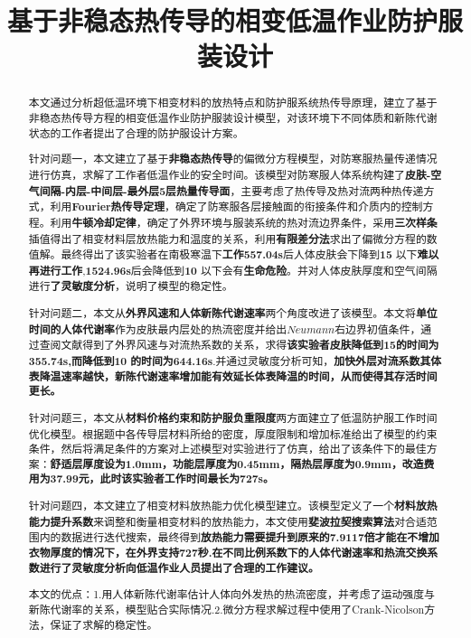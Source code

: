 \documentclass[withoutpreface,bwprint]{cumcmthesis} %
\title{基于非稳态热传导的相变低温作业防护服装设计}
\begin{document}
\maketitle
\begin{abstract}
	本文通过分析超低温环境下相变材料的放热特点和防护服系统热传导原理，建立了基于非稳态热传导方程的相变低温作业防护服装设计模型，对该环境下不同体质和新陈代谢状态的工作者提出了合理的防护服设计方案。
		
	针对问题一，本文建立了基于\textbf{非稳态热传导}的偏微分方程模型，对防寒服热量传递情况进行仿真，求解了工作者低温作业的安全时间。该模型对防寒服人体系统构建了\textbf{皮肤-空气间隔-内层-中间层-最外层5层热量传导面}，主要考虑了热传导及热对流两种热传递方式，利用\textbf{Fourier热传导定理}，确定了防寒服各层接触面的衔接条件和介质内的控制方程。利用\textbf{牛顿冷却定律}，确定了外界环境与服装系统的热对流边界条件，采用\textbf{三次样条}插值得出了相变材料层放热能力和温度的关系，利用\textbf{有限差分法}求出了偏微分方程的数值解。最终得出了该实验者在南极寒温下\textbf{工作557.04s}后人体皮肤会下降到\textbf{15} \textcelsius 以下\textbf{难以再进行工作},\textbf{1524.96s}后会降低到\textbf{10} \textcelsius 以下会有\textbf{生命危险}。并对人体皮肤厚度和空气间隔进行\textbf{了灵敏度分析}，说明了模型的稳定性。
	
	针对问题二，本文从\textbf{外界风速和人体新陈代谢速率}两个角度改进了该模型。本文将\textbf{单位时间的人体代谢率}作为皮肤最内层处的热流密度并给出$Neumann$右边界初值条件，通过查阅文献得到了外界风速与对流热系数的关系，求得\textbf{该实验者皮肤降低到15}\textcelsius \textbf{的时间为355.74s,而降低到10} \textcelsius \textbf{的时间为644.16s}.并通过灵敏度分析可知，\textbf{加快外层对流系数其体表降温速率越快，新陈代谢速率增加能有效延长体表降温的时间，从而使得其存活时间更长。}
	
	针对问题三，本文从\textbf{材料价格约束和防护服负重限度}两方面建立了低温防护服工作时间优化模型。根据题中各传导层材料所给的密度，厚度限制和增加标准给出了模型的约束条件，然后将满足条件的方案对上述模型对实验进行了仿真，给出了该条件下的最佳方案：\textbf{舒适层厚度设为1.0mm，功能层厚度为0.45mm，隔热层厚度为0.9mm，改造费用为37.99元，此时该实验者工作时间最长为727s。}
	
	针对问题四，本文建立了相变材料放热能力优化模型建立。该模型定义了一个\textbf{材料放热能力提升系数}来调整和衡量相变材料的放热能力，本文使用\textbf{斐波拉契搜索算法}对合适范围内的数据进行迭代搜索，最终得到\textbf{放热能力需要提升到原来的7.9117倍才能在不增加衣物厚度的情况下，在外界支持727秒.}\textbf{在不同比例系数下的人体代谢速率和热流交换系数进行了灵敏度分析向低温作业人员提出了合理的工作建议。}
	
	本文的优点：1.用人体新陈代谢率估计人体向外发热的热流密度，并考虑了运动强度与新陈代谢率的关系，模型贴合实际情况.2.微分方程求解过程中使用了Crank-Nicolson方法，保证了求解的稳定性。
	
	\end{abstract}
\end{document}
